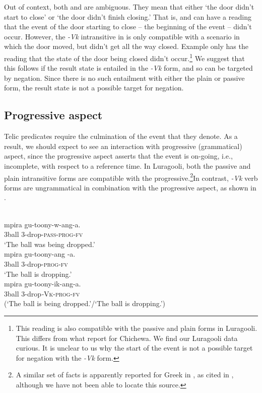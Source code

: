 \documentclass[output=paper]{langsci/langscibook}
\begin{document}
Out of context, both  and  are ambiguous. They mean that either ‘the door didn’t start to close’ or ‘the door didn’t finish closing.’ That is,  and  can have a reading that the event of the door starting to close – the beginning of the event – didn’t occur. However, the \textit{-Vk }intransitive in  is only compatible with a scenario in which the door moved, but didn’t get all the way closed. Example  only has the reading that the state of the door being closed didn’t occur.\footnote{ This reading is also compatible with the passive and plain forms in Luragooli. This differs from what \citet{DubinskySimango1996} report for Chichewa. We find our Luragooli data curious. It is unclear to us why the start of the event is not a possible target for negation with the \textit{-Vk} form. } We suggest that this follows if the result state is entailed in the \textit{-Vk} form, and so can be targeted by negation. Since there is no such entailment with either the plain or passive form, the result state is not a possible target for negation.

\subsection{Progressive aspect}

Telic predicates require the culmination of the event that they denote. As a result, we should expect to see an interaction with progressive (grammatical) aspect, since the progressive aspect asserts that the event is on-going, i.e., incomplete, with respect to a reference time. In Luragooli, both the passive  and plain intransitive  forms are compatible with the progressive.\footnote{ A similar set of facts is apparently reported for Greek in \citet{Mavromanolaki2002}, as cited in \citet{AlexiadouEtAl2015}, although we have not been able to locate this source. }In contrast, \textit{-Vk} verb forms are ungrammatical in combination with the progressive aspect, as shown in .

\ea\label{exx:}
\ea
{}\\
\gll mpira gu-toony-w-ang-a.\\
     3ball  3-drop-\textsc{pass}-\textsc{prog}-\textsc{fv}\\
\glt ‘The ball was being dropped.’
\ex
{}\\
\gll mpira gu-toony-ang -a.\\
     3ball  3-drop-\textsc{prog}-\textsc{fv}\\
\glt ‘The ball is dropping.’
\ex
{}\\
\gll *mpira gu-toony-ik-ang-a.\\
     \textit{ }3ball    3-drop\textit{-}\textsc{Vk}-\textsc{prog}-\textsc{fv}\\
\glt  (‘The ball is being dropped.’/‘The ball is dropping.’)
\z
\z
\end{document}
